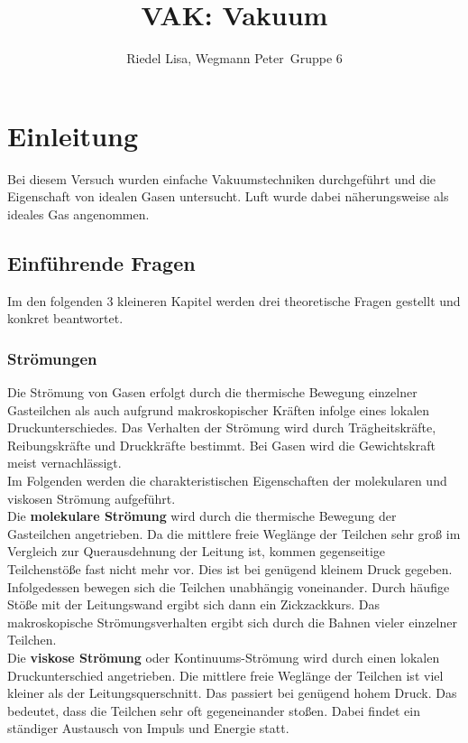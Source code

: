 \documentclass[a4paper,usenatbib]{aspdoc}
\title[]{VAK: Vakuum}
\author[]{
    Riedel Lisa, Wegmann Peter
    \newauthor
    \,Gruppe 6
}
\begin{document}
    \label{firstpage}
    \pagerange{\pageref{firstpage}--\pageref{lastpage}}
    \maketitle
    
    

    \section{Einleitung}\label{sec:intro}
                Bei diesem Versuch wurden einfache Vakuumstechniken durchgeführt und die Eigenschaft von idealen Gasen untersucht. Luft wurde dabei näherungsweise als ideales Gas angenommen.
                
        \subsection{Einführende Fragen}
                Im den folgenden 3 kleineren Kapitel werden drei theoretische Fragen gestellt und konkret beantwortet.
            
            \subsubsection{Strömungen}
                Die Strömung von Gasen erfolgt durch die thermische Bewegung einzelner Gasteilchen als auch aufgrund makroskopischer Kräften infolge eines lokalen Druckunterschiedes. Das Verhalten der Strömung wird durch Trägheitskräfte, Reibungskräfte und Druckkräfte bestimmt. Bei Gasen wird die Gewichtskraft meist vernachlässigt.\\
                Im Folgenden werden die charakteristischen Eigenschaften der molekularen und viskosen Strömung aufgeführt.\\
                Die \textbf{molekulare Strömung} wird durch die thermische Bewegung der Gasteilchen angetrieben. Da die mittlere freie Weglänge der Teilchen sehr groß im Vergleich zur Querausdehnung der Leitung ist, kommen gegenseitige  Teilchenstöße fast nicht mehr vor. Dies ist bei genügend kleinem Druck gegeben. Infolgedessen bewegen sich die Teilchen unabhängig voneinander. Durch häufige Stöße mit der Leitungswand ergibt sich dann ein Zickzackkurs. Das makroskopische Strömungsverhalten ergibt sich durch die Bahnen vieler einzelner Teilchen. \\
                Die \textbf{viskose Strömung} oder Kontinuums-Strömung wird durch einen lokalen Druckunterschied angetrieben. Die mittlere freie Weglänge der Teilchen ist viel kleiner als der Leitungsquerschnitt. Das passiert bei genügend hohem Druck. Das bedeutet, dass die Teilchen sehr oft gegeneinander stoßen. Dabei findet ein ständiger Austausch von Impuls und Energie statt. \cite{Vaktech}
            
\end{document}
